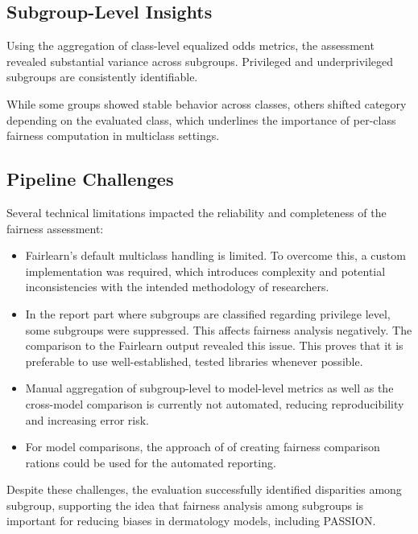 \documentclass[12pt, a4paper, oneside]{book}   	%
\renewcommand{\todo}[1]{\textcolor{red}{TODO: #1}}
\begin{document}
		
		\subsection{Subgroup-Level Insights}
		Using the aggregation of class-level equalized odds metrics, the assessment revealed substantial variance across subgroups. Privileged and underprivileged subgroups are consistently identifiable.
		
		While some groups showed stable behavior across classes, others shifted category depending on the evaluated class, which underlines the importance of per-class fairness computation in multiclass settings.	
		
		
		\subsection{Pipeline Challenges}
		
		Several technical limitations impacted the reliability and completeness of the fairness assessment:
		\begin{itemize}
			\item \gls{Fairlearn}’s default multiclass handling is limited. To overcome this, a custom implementation was required, which introduces complexity and potential inconsistencies with the intended methodology of researchers.
			\item In the report part where subgroups are classified regarding privilege level, some subgroups were suppressed. This affects fairness analysis negatively. The comparison to the \gls{Fairlearn} output revealed this issue. This proves that it is preferable to use well-established, tested libraries whenever possible.
			\item Manual aggregation of subgroup-level to model-level metrics as well as the cross-model comparison is currently not automated, reducing reproducibility and increasing error risk.
			\item For model comparisons, the approach of \textcite{Valentim_2019} of creating fairness comparison rations could be used for the automated reporting.
		\end{itemize}
		
		Despite these challenges, the evaluation successfully identified disparities among subgroup, supporting the idea that fairness analysis among subgroups is important for reducing biases in dermatology models, including PASSION.
		
\end{document}
